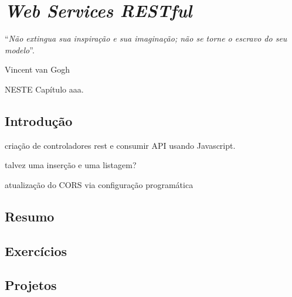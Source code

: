 \chapter{\textit{Web Services RESTful}}\label{cap:webservicesRestful}
\epigraph{``\textit{Não extingua sua inspiração e sua imaginação; não se torne o escravo do seu modelo}''.}{Vincent van Gogh}

\lettrine[lines=4, lhang=0.1, lraise=0, loversize=0.2, findent=0.1em]{\textcolor{corTema}{N}}{ESTE} Capítulo aaa.

\vfill

\section{Introdução}

criação de controladores rest e consumir API usando Javascript.

talvez uma inserção e uma listagem?

atualização do CORS via configuração programática

\section{Resumo}

\section{Exercícios}

\section{Projetos}
